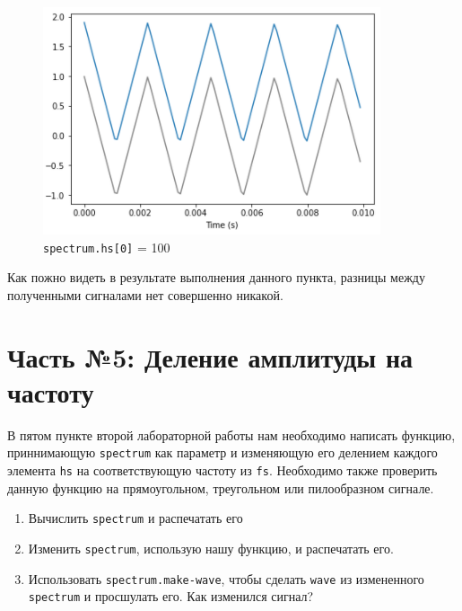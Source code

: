 \documentclass[a4paper]{article}
\begin{document}
            \begin{figure}[H]
                \centering
                \includegraphics[width=\textwidth]{ex_4_triangle_signal_compare.png}
                \caption{\texttt{spectrum.hs[0]} = 100}
                \label{fig:ex_4_triangle_signal_compare}
            \end{figure}
            
            Как пожно видеть в результате выполнения данного пункта, разницы между полученными сигналами нет совершенно никакой.
    
    \newpage
        \section{Часть №5: Деление амплитуды на частоту}
            В пятом пункте второй лабораторной работы нам необходимо  написать функцию, приннимающую \texttt{spectrum} как параметр и изменяющую его делением каждого элемента \texttt{hs} на соответствующую частоту из \texttt{fs}.
            Необходимо также проверить данную функцию на прямоугольном, треугольном или пилообразном сигнале.
            
                \begin{enumerate}
                    \item Вычислить \texttt{spectrum} и распечатать его
                    \item Изменить \texttt{spectrum}, использую нашу функцию, и распечатать его.
                    \item Использовать \texttt{spectrum.make-wave}, чтобы сделать \texttt{wave} из измененного \texttt{spectrum} и просшулать его. Как изменился сигнал?
                \end{enumerate}
                
\end{document}
